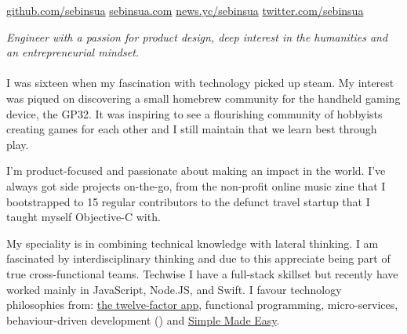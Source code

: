 \documentclass[10pt,a4paper]{article}
\begin{document}
\sloppy  %


\nobreakvspace{0.3em}  %

\noindent\href{http://github.com/sebinsua}{github.com/sebinsua}\sbull
\href{http://sebinsua.com}{sebinsua.com}\sbull
\href{https://news.ycombinator.com/user?id=lhnz}{news.yc/sebinsua}\sbull
\href{http://twitter.com/sebinsua}{twitter.com/sebinsua}

\spacedhrule{0.9em}{-0.4em}  %


\vspace{-1.3em}  %
\begin{multicols}{2}  %
\noindent \emph{Engineer with a passion for product design, deep interest in the humanities and an entrepreneurial mindset.}
\\
\\
I was sixteen when my fascination with technology picked up steam. My interest was piqued on discovering a small homebrew community for the handheld gaming device, the GP32. It was inspiring to see a flourishing community of hobbyists creating games for each other and I still maintain that we learn best through play.\newline

I'm product-focused and passionate about making an impact in the world. I've always got side projects on-the-go, from the non-profit online music zine that I bootstrapped to 15 regular contributors to the defunct travel startup that I taught myself Objective-C with.\newline

My speciality is in combining technical knowledge with lateral thinking. I am fascinated by interdisciplinary thinking and due to this appreciate being part of true cross-functional teams. Techwise I have a full-stack skillset but recently have worked mainly in JavaScript, Node.JS, and Swift. I favour technology philosophies from: \href{http://12factor.net}{the twelve-factor app}, functional programming, micro-services, behaviour-driven development () and \href{http://infoq.com/presentations/Simple-Made-Easy}{Simple Made Easy}.\newline

\end{multicols}
\end{document}

